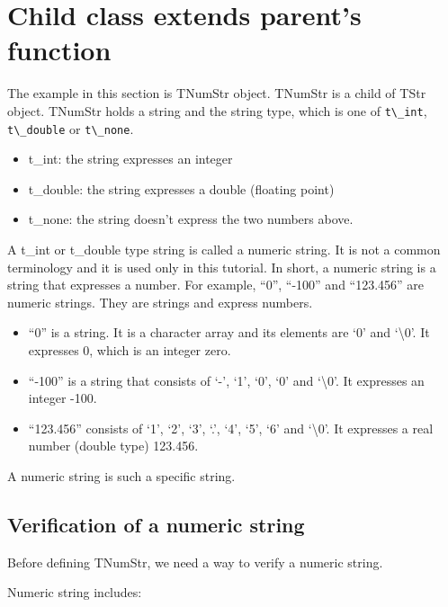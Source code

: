\section{Child class extends parent's
function}\label{child-class-extends-parents-function}

The example in this section is TNumStr object. TNumStr is a child of
TStr object. TNumStr holds a string and the string type, which is one of
\passthrough{\lstinline!t\_int!}, \passthrough{\lstinline!t\_double!} or
\passthrough{\lstinline!t\_none!}.

\begin{itemize}
\tightlist
\item
  t\_int: the string expresses an integer
\item
  t\_double: the string expresses a double (floating point)
\item
  t\_none: the string doesn't express the two numbers above.
\end{itemize}

A t\_int or t\_double type string is called a numeric string. It is not
a common terminology and it is used only in this tutorial. In short, a
numeric string is a string that expresses a number. For example, ``0'',
``-100'' and ``123.456'' are numeric strings. They are strings and
express numbers.

\begin{itemize}
\tightlist
\item
  ``0'' is a string. It is a character array and its elements are `0'
  and `\textbackslash0'. It expresses 0, which is an integer zero.
\item
  ``-100'' is a string that consists of `-', `1', `0', `0' and
  `\textbackslash0'. It expresses an integer -100.
\item
  ``123.456'' consists of `1', `2', `3', `.', `4', `5', `6' and
  `\textbackslash0'. It expresses a real number (double type) 123.456.
\end{itemize}

A numeric string is such a specific string.

\subsection{Verification of a numeric
string}\label{verification-of-a-numeric-string}

Before defining TNumStr, we need a way to verify a numeric string.

Numeric string includes:

